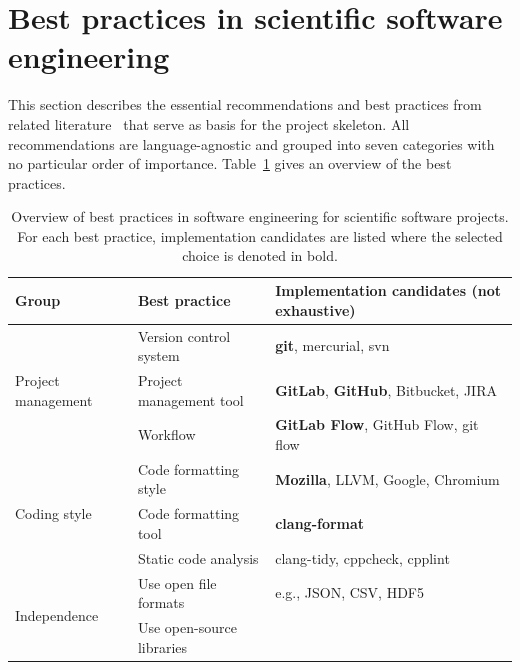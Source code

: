 \documentclass[@CLASSOPTIONS@]{tumarticle}
\begin{document}
\section{Best practices in scientific software engineering}
\label{sec:measures}

This section describes the essential recommendations and best practices from
related literature~\cite{nowogrodzki2019, hunt1999pragmatic, prlic2012, %
  bangerth2013, wilson2014, wilson2017, schlauch2018dlrguide, %
  netherlands-guide2019} that serve as basis for the project skeleton.
All recommendations are language-agnostic and grouped into seven categories
with no particular order of importance. Table~\ref{tab:practices} gives an
overview of the best practices.

\begin{table}
  \centering
  \caption{Overview of best practices in software engineering for
    scientific software projects. For each best practice, implementation
    candidates are listed where the selected choice is denoted in bold.}
  \label{tab:practices}
  \begin{tabular}{lll}
    \hline
    \textbf{Group}                      & \textbf{Best practice}        &
    \textbf{Implementation candidates (not exhaustive)}
    \\
    \hline
    \multirow{3}{*}{Project management} & Version control system        &
    \textbf{git}, mercurial, svn
    \\
    \cline{2-3}
                                        & Project management tool       &
    \textbf{GitLab}, \textbf{GitHub}, Bitbucket, JIRA
    \\
    \cline{2-3}
                                        & Workflow                      &
    \textbf{GitLab Flow}, GitHub Flow, git flow
    \\
    \hline
    \multirow{3}{*}{Coding style}       & Code formatting style         &
    \textbf{Mozilla}, LLVM, Google, Chromium
    \\
    \cline{2-3}
                                        & Code formatting tool          &
    \textbf{clang-format}
    \\
    \cline{2-3}
                                        & Static code analysis          &
    clang-tidy, cppcheck, cpplint
    \\
    \hline
    \multirow{2}{*}{Independence}       & Use open file formats         &
    e.g., JSON, CSV, HDF5
    \\
    \cline{2-3}
                                        & Use open-source libraries     &

\end{tabular}
\end{table}
\end{document}
